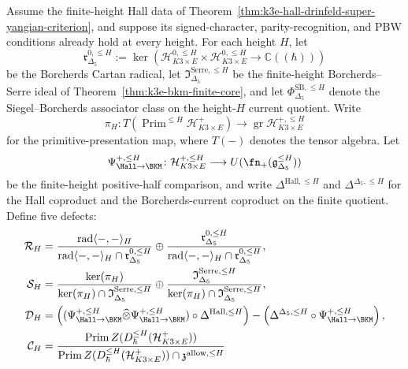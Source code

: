 \begin{theorem}
\label{thm:k3e-finite-height-hall-radical-serre-kernel}
Assume the finite-height Hall data of
Theorem~\ref{thm:k3e-hall-drinfeld-super-yangian-criterion}, and
suppose its signed-character, parity-recognition, and PBW conditions
already hold at every height. For each height \(H\), let
\[
 \mathfrak r^{0,\leq H}_{\Delta_5}
 :=
 \ker\!\left(
 \mathcal H^{0,\leq H}_{K3\times E}
 \times
 \mathcal H^{0,\leq H}_{K3\times E}
 \to \mathbb C((\hbar))
 \right)
\]
be the Borcherds Cartan radical, let
\(\mathfrak I^{\mathrm{Serre},\leq H}_{\Delta_5}\) be the
finite-height Borcherds--Serre ideal of
Theorem~\ref{thm:k3e-bkm-finite-core}, and let
\(\Phi^{\mathrm{SB},\leq H}_{\Delta_5}\) denote the
Siegel--Borcherds associator class on the height-\(H\) current
quotient. Write
\[
 \pi_H\colon
 T(\operatorname{Prim}^{\leq H}\mathcal H^+_{K3\times E})
 \longrightarrow
 \operatorname{gr}\mathcal H^{+,\leq H}_{K3\times E}
\]
for the primitive-presentation map, where \(T(-)\) denotes the tensor
algebra. Let
\[
 \Psi^{+,\leq H}_{\Hall\to\BKM}\colon
 \mathcal H^{+,\leq H}_{K3\times E}
 \longrightarrow
 U(\fn_+(\mathfrak g_{\Delta_5}^{\leq H}))
\]
be the finite-height positive-half comparison, and write
\(\Delta^{\mathrm{Hall},\leq H}\) and
\(\Delta^{\Delta_5,\leq H}\) for the Hall coproduct and the
Borcherds-current coproduct on the finite quotient. Define five
defects:
\[
\begin{aligned}
 \mathcal R_H
 &=
 \frac{\operatorname{rad}\langle-,-\rangle_H}
 {\operatorname{rad}\langle-,-\rangle_H
 \cap\mathfrak r^{0,\leq H}_{\Delta_5}}
 \oplus
 \frac{\mathfrak r^{0,\leq H}_{\Delta_5}}
 {\operatorname{rad}\langle-,-\rangle_H
 \cap\mathfrak r^{0,\leq H}_{\Delta_5}},\\
 \mathcal S_H
 &=
 \frac{\ker(\pi_H)}
 {\ker(\pi_H)\cap\mathfrak I^{\mathrm{Serre},\leq H}_{\Delta_5}}
 \oplus
 \frac{\mathfrak I^{\mathrm{Serre},\leq H}_{\Delta_5}}
 {\ker(\pi_H)\cap\mathfrak I^{\mathrm{Serre},\leq H}_{\Delta_5}},\\
 \mathcal D_H
 &=
 \left(
 (\Psi^{+,\leq H}_{\Hall\to\BKM}\widehat\otimes
 \Psi^{+,\leq H}_{\Hall\to\BKM})
 \circ \Delta^{\mathrm{Hall},\leq H}
 \right)
 -
 \left(
 \Delta^{\Delta_5,\leq H}\circ
 \Psi^{+,\leq H}_{\Hall\to\BKM}
 \right),\\
 \mathcal C_H
 &=
 \frac{\operatorname{Prim}Z(D^{\leq H}_\hbar(\mathcal H^+_{K3\times E}))}
 {\operatorname{Prim}Z(D^{\leq H}_\hbar(\mathcal H^+_{K3\times E}))
 \cap\mathfrak z^{\mathrm{allow},\leq H}}

\end{aligned}\]
\end{theorem}
